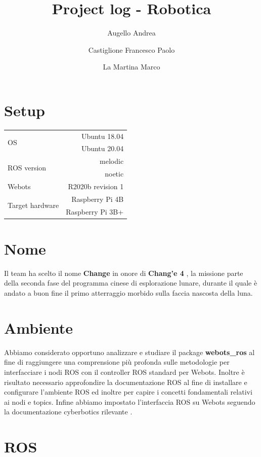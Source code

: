 \documentclass[a4paper]{article}
\begin{document}
	\title{Project log - Robotica}
	\author{Augello Andrea \and Castiglione Francesco Paolo \and La Martina Marco}
	\maketitle
	\tableofcontents

	\section{Setup}\label{sec:Setup}
	\begin{tabular}{|l|r|}
		\hline
		\multirow{2}{4em}{OS} & Ubuntu 18.04 \\
							  & Ubuntu 20.04 \\ \hline
		\multirow{2}{6em}{ROS version} & melodic \\
									   & noetic \\ \hline
		Webots & R2020b revision 1\\ \hline
		\multirow{2}{11em}{Target hardware} & Raspberry Pi 4B \\
											& Raspberry Pi 3B+ \\ \hline
	\end{tabular}

	\section{Nome}\label{sec:Nome}
	Il team ha scelto il nome \textbf{Change} in onore di \textbf{Chang'e 4} \cite{change4}, la missione parte della seconda fase del programma cinese di esplorazione lunare, durante il quale è andato a buon fine il primo atterraggio morbido sulla faccia nascosta della luna. 

	\section{Ambiente}\label{sec:Ambiente}
	Abbiamo considerato opportuno analizzare e studiare il package \textbf{webots\_ros} \cite{webotsRosSetup} al fine di raggiungere una comprensione più profonda sulle metodologie per interfacciare i nodi ROS con il controller ROS standard per Webots. Inoltre è risultato necessario approfondire la documentazione ROS \cite{ros.org} al fine di installare e configurare l'ambiente ROS ed inoltre per capire i concetti fondamentali relativi ai nodi e topics. Infine abbiamo impostato l'interfaccia ROS su Webots seguendo la documentazione cyberbotics rilevante \cite{ros.org}.
	
	\section{ROS}\label{sec:Ros}
	
\end{document}
